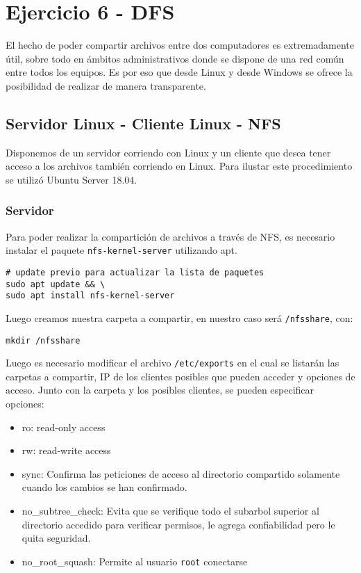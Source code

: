 \section{Ejercicio 6 - DFS}

El hecho de poder compartir archivos entre dos computadores es extremadamente útil, sobre todo en ámbitos administrativos donde se dispone de una red común entre todos los equipos. Es por eso que desde Linux y desde Windows se ofrece la posibilidad de realizar de manera transparente.

\subsection{Servidor Linux - Cliente Linux - NFS}

Disponemos de un servidor corriendo con Linux y un cliente que desea tener acceso a los archivos también corriendo en Linux. Para ilustar este procedimiento se utilizó Ubuntu Server 18.04.

\subsubsection{Servidor}

Para poder realizar la compartición de archivos a través de NFS, es necesario instalar el paquete \texttt{nfs-kernel-server} utilizando apt.

\begin{lstlisting}
# update previo para actualizar la lista de paquetes
sudo apt update && \
sudo apt install nfs-kernel-server
\end{lstlisting}

Luego creamos nuestra carpeta a compartir, en nuestro caso será \texttt{/nfsshare}, con:

\begin{lstlisting}
mkdir /nfsshare
\end{lstlisting}

Luego es necesario modificar el archivo \texttt{/etc/exports} en el cual se listarán las carpetas a compartir, IP de los clientes posibles que pueden acceder y opciones de acceso. Junto con la carpeta y los posibles clientes, se pueden especificar opciones:

\begin{itemize}
    \item ro: read-only access
    \item rw: read-write access
    \item sync: Confirma las peticiones de acceso al directorio compartido solamente cuando los cambios se han confirmado.
    \item no\_subtree\_check: Evita que se verifique todo el subarbol superior al directorio accedido para verificar permisos, le agrega confiabilidad pero le quita seguridad. 
    \item no\_root\_squash: Permite al usuario \texttt{root} conectarse
\end{itemize}


